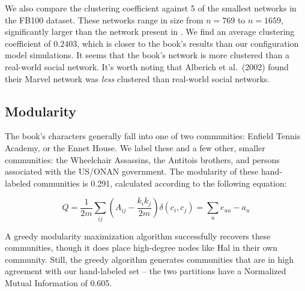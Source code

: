 We also compare the clustering coefficient against 5 of the smallest networks in the FB100 dataset. These networks range in size from $n=769$ to $n=1659$, significantly larger than the network present in \infinitejest. We find an average clustering coefficient of $0.2403$, which is closer to the book's results than our configuration model simulations. It seems that the book's network is more clustered than a real-world social network. It's worth noting that Alberich et al.\ (2002) found their Marvel network was \textit{less} clustered than real-world social networks.\cite{2002marvel}

\subsection{Modularity}
The book's characters generally fall into one of two communities: Enfield Tennis Academy, or the Ennet House. We label these and a few other, smaller communities: the Wheelchair Assassins, the Antitois brothers, and persons associated with the US/ONAN government. The modularity of these hand-labeled communities is 0.291, calculated according to the following equation:

$$Q = \frac{1}{2m}\sum_{ij} \left(A_{ij} - \frac{k_ik_j}{2m} \right) \delta(c_i,c_j) = \sum_u e_{uu} - a_u $$

A greedy modularity maximization algorithm successfully recovers these communities, though it does place high-degree nodes like Hal in their own community. Still, the greedy algorithm generates communities that are in high agreement with our hand-labeled set -- the two partitions have a Normalized Mutual Information of 0.605.

